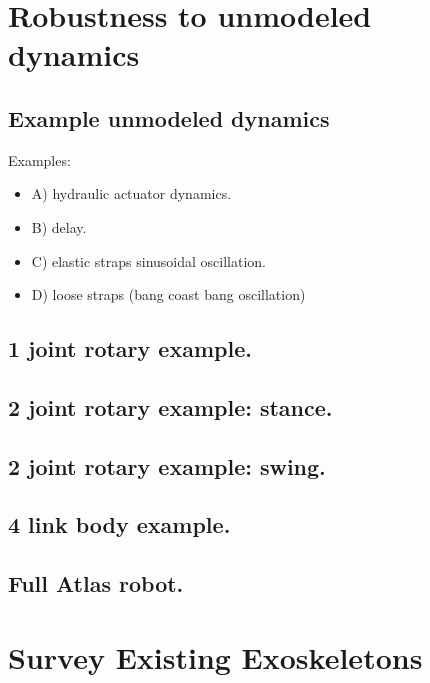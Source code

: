 \documentclass[letterpaper,12pt,fullpage]{article}
\begin{document}
\section{Robustness to unmodeled dynamics}

\subsection{Example unmodeled dynamics}

Examples:
\begin{itemize}
\item
A) hydraulic actuator dynamics.
\item
B) delay. 
\item
C) elastic straps sinusoidal oscillation.
\item
D) loose straps (bang coast bang oscillation)
\end{itemize}

\subsection{1 joint rotary example.}

\subsection{2 joint rotary example: stance.}

\subsection{2 joint rotary example: swing.}

\subsection{4 link body example.}

\subsection{Full Atlas robot.}

\section{Survey Existing Exoskeletons}








\end{document}
